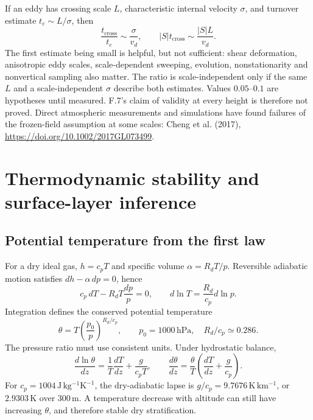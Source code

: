 \documentclass[11pt,a4paper]{article}
\numberwithin{equation}{section}
\begin{document}
If an eddy has crossing scale $L$, characteristic internal velocity
$\sigma$, and turnover estimate $t_e\sim L/\sigma$, then
\begin{equation}
 \frac{t_{\mathrm{cross}}}{t_e}\sim\frac{\sigma}{v_d},\qquad
 |S|t_{\mathrm{cross}}\sim\frac{|S|L}{v_d}.
\end{equation}
The first estimate being small is helpful, but not sufficient: shear
deformation, anisotropic eddy scales, scale-dependent sweeping, evolution,
nonstationarity and nonvertical sampling also matter. The ratio is
scale-independent only if the same $L$ and a scale-independent $\sigma$
describe both estimates. Values $0.05$--$0.1$ are hypotheses until measured.
F.7's claim of validity at every height is therefore not proved.
Direct atmospheric measurements and simulations have found failures of the
frozen-field assumption at some scales: Cheng et al. (2017),
\url{https://doi.org/10.1002/2017GL073499}.

\section{Thermodynamic stability and surface-layer inference}
\label{sec:boundary}

\subsection{Potential temperature from the first law}

For a dry ideal gas, $h=c_pT$ and specific volume $\alpha=R_dT/p$.
Reversible adiabatic motion satisfies $dh-\alpha\,dp=0$, hence
\begin{equation}
 c_p\,dT-R_dT\frac{dp}{p}=0,
 \qquad d\ln T=\frac{R_d}{c_p}d\ln p.
\end{equation}
Integration defines the conserved potential temperature
\begin{equation}
 \theta=T\left(\frac{p_0}{p}\right)^{R_d/c_p},
 \qquad p_0=1000\,\mathrm{hPa},\quad R_d/c_p\simeq0.286.
\end{equation}
The pressure ratio must use consistent units. Under hydrostatic balance,
\begin{equation}
 \frac{d\ln\theta}{dz}
 =\frac{1}{T}\frac{dT}{dz}+\frac{g}{c_pT},
 \qquad
 \frac{d\theta}{dz}=\frac{\theta}{T}
                    \left(\frac{dT}{dz}+\frac{g}{c_p}\right).
\end{equation}
For $c_p=1004\,\mathrm{J\,kg^{-1}K^{-1}}$, the dry-adiabatic lapse
is $g/c_p=9.7676\,\mathrm{K\,km^{-1}}$, or $2.9303\,\mathrm K$
over $300\,\mathrm m$. A temperature decrease with altitude can still
have increasing $\theta$, and therefore stable dry stratification.
\end{document}
